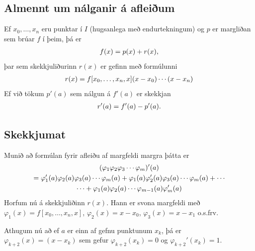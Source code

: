 \documentclass[A4paper,10pt,icelandic]{sphinxmanual}
\begin{document}
\subsection{Almennt um nálganir á afleiðum}
\label{kafli04:almennt-um-nalganir-a-afleium}
Ef \(x_0,\ldots, x_n\) eru punktar í \(I\) (hugsanlega með
endurtekningum) og \(p\) er margliðan sem brúar \(f\) í þeim, þá
er
\begin{gather}
\begin{split}f(x) = p(x) + r(x),\end{split}\notag
\end{gather}
þar sem skekkjuliðurinn \(r(x)\) er gefinn með formúlunni
\begin{gather}
\begin{split}r(x)=f[x_0,\ldots,x_n,x](x-x_0)\cdots(x-x_n)\end{split}\notag
\end{gather}
Ef við tökum \(p'(a)\) sem nálgun á \(f'(a)\) er skekkjan
\begin{gather}
\begin{split}r'(a) =  f'(a) - p'(a).\end{split}\notag
\end{gather}

\subsection{Skekkjumat}
\label{kafli04:index-5}\label{kafli04:id1}
Munið að formúlan fyrir afleiðu af margfeldi margra þátta er
\begin{gather}
\begin{split}\begin{gathered}
  (\varphi_1\varphi_2\varphi_3\cdots\varphi_m)'(a)\\
=\varphi_1'(a)\varphi_2(a)\varphi_3(a)\cdots\varphi_m(a)
+\varphi_1(a)\varphi_2'(a)\varphi_3(a)\cdots\varphi_m(a)
+\cdots\\
\cdots+\varphi_1(a)\varphi_2(a)\cdots \varphi_{m-1}(a)\varphi_m'(a)\\\end{gathered}\end{split}\notag
\end{gather}
Horfum nú á skekkjuliðinn \(r(x)\). Hann er svona margfeldi með
\(\varphi_1(x)=f[x_0,\dots,x_n,x]\), \(\varphi_2(x)=x-x_0\),
\(\varphi_3(x)=x-x_1\) o.s.frv.

Athugum nú að ef \(a\) er einn af gefnu punktunum \(x_k\), þá er
\(\varphi_{k+2}(x)=(x-x_k)\) sem gefur \(\varphi_{k+2}(x_k)=0\)
og \(\varphi_{k+2}'(x_k)=1\).
\end{document}
